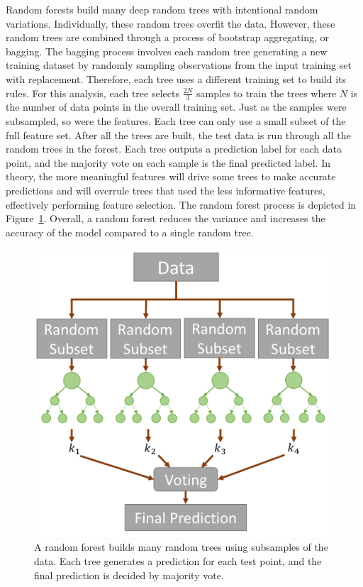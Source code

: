 \documentclass[12pt]{report}
\begin{document}
Random forests build many deep random trees with intentional random variations.
Individually, these random trees overfit the data.
However, these random trees are combined through a process of bootstrap aggregating, or bagging.
The bagging process involves each random tree generating a new training dataset by randomly sampling observations from the input training set with replacement.
Therefore, each tree uses a different training set to build its rules.
For this analysis, each tree selects $\frac{2N}{3}$ samples to train the trees where $N$ is the number of data points in the overall training set.
Just as the samples were subsampled, so were the features.
Each tree can only use a small subset of the full feature set.
After all the trees are built, the test data is run through all the random trees in the forest.
Each tree outputs a prediction label for each data point, and the majority vote on each sample is the final predicted label.
In theory, the more meaningful features will drive some trees to make accurate predictions and will overrule trees that used the less informative features, effectively performing feature selection.
The random forest process is depicted in Figure~\ref{fig:random_forest_diagram}.
Overall, a random forest reduces the variance and increases the accuracy of the model compared to a single random tree.

\begin{figure}[t]
	\centering
	\includegraphics[width=0.6\columnwidth,trim={0mm 0mm 0mm 0mm},clip]{RandForest}
	\vspace{-15pt}
	\caption[Random forest prediction process]{A random forest builds many random trees using subsamples of the data.  Each tree generates a prediction for each test point, and the final prediction is decided by majority vote.}
	\label{fig:random_forest_diagram}
\end{figure}
\end{document}
